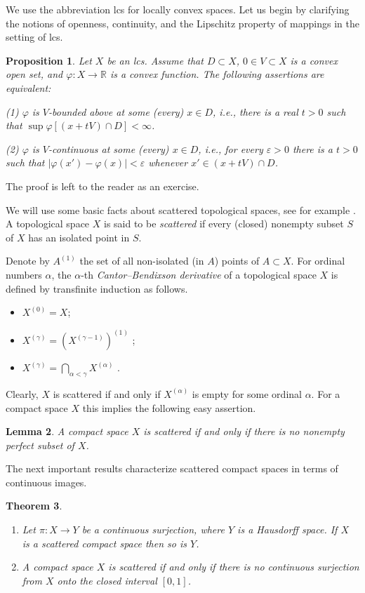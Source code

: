 \documentclass[12pt]{amsart}
\theoremstyle{plain}
\newtheorem{theorem}{Theorem}[section]
\newtheorem{proposition}[theorem]{Proposition}
\newtheorem{lemma}[theorem]{Lemma}
\theoremstyle{definition}
\theoremstyle{remark}
\def\ee{\varepsilon}
\def\R{{\mathbb R}}
\def\vv{\varphi}
\def\ee{\varepsilon}
\def\ee{\varepsilon}
\begin{document}
We use the abbreviation lcs for locally convex spaces.
Let us begin by clarifying the notions of openness, continuity, and the Lipschitz property of mappings in the setting of lcs.

\begin{proposition}\label{ocl}
Let $X$ be an lcs. Assume that $D\subset X$,  $0\in V\subset X$ is a convex open set,  and $\vv: X\to \R$ is a convex function.
The following assertions are equivalent:

(1) $\vv$ is $V$-bounded above at some (every) $x\in D$, i.e., there is a real $t > 0$ such that
 $\sup\vv[(x+tV)\cap D]<\infty$.

(2) $\vv$ is $V$-continuous at some (every) $x\in D$, i.e., for every $\ee>0$ there is a $t>0$ such that $|\vv(x')-\vv(x)|<\ee$ whenever $x'\in (x+tV)\cap D$.
\end{proposition}

\noindent The proof is left to the reader as an exercise.

We will use some basic facts about scattered topological spaces, see for example \cite[Section 8.5]{Semadeni}.
A topological space $X$ is said to be {\it scattered} if every (closed) nonempty
subset $S$ of $X$ has an isolated point in $S$.

Denote by $A^{(1)}$  the set of all non-isolated (in $A$) points of $A \subset X$.
For ordinal numbers $\alpha$, the $\alpha$-th {\it Cantor--Bendixson derivative} of a topological space $X$
is defined by transfinite induction as follows.
\begin{itemize}
\item  $X^{(0)} = X$;
\item  $X^{(\gamma)} = (X^{(\gamma-1)})^{(1)}$ ;
\item  $X^{(\gamma)} = \bigcap_{\alpha<\gamma} X^{(\alpha)}$ .
\end{itemize}
Clearly,  $X$ is scattered if and only if  $X^{(\alpha)}$ is empty for some ordinal $\alpha$.
For a compact space $X$ this implies the following easy assertion.

\begin{lemma} \label{scattered}
A compact space $X$ is scattered if and only if there is no nonempty perfect subset of $X$.
\end{lemma}

The next important results characterize scattered compact spaces in terms of continuous images.

\begin{theorem}\label{sca}\hfill
 \begin{enumerate}
\item {\rm \cite[Proposition 8.5.3]{Semadeni}}
Let $\pi: X \to Y$ be a continuous surjection, where $Y$ is a Hausdorff space.
If $X$ is a scattered compact space then so is $Y$.
\item {\rm \cite[Theorem 8.5.4]{Semadeni}}
A compact space $X$ is scattered if and only if there is no  continuous surjection from $X$ onto the closed interval $[0,1]$.
\end{enumerate}
\end{theorem}
\end{document}
